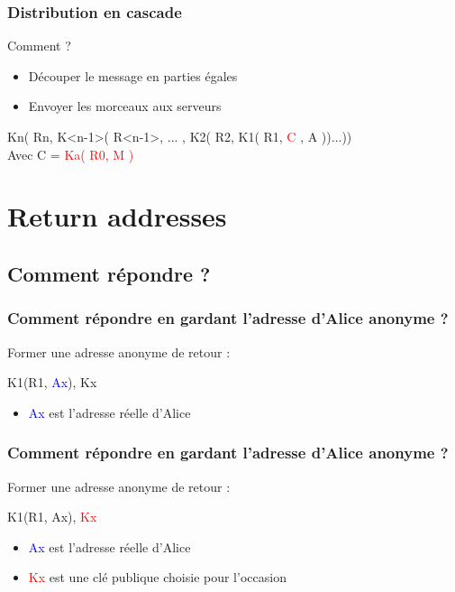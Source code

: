 \documentclass{beamer}
\begin{document}
\begin{frame}
\frametitle{Distribution en cascade}
\begin{block}{Comment ?}
\begin{itemize}
[triangle]
\item Découper le message en parties égales
\item Envoyer les morceaux aux serveurs
\end{itemize}
\end{block}

Kn( Rn, K<n-1>( R<n-1>, ... , K2( R2, K1( R1, \textcolor{red}{C} , A ))...))\\
$ $\\
Avec C = \textcolor{red}{Ka( R0, M )}

\end{frame}


\section{Return addresses}
\subsection{Comment répondre ?}
\begin{frame}
\frametitle{Comment répondre en gardant l'adresse d'Alice anonyme ?}
Former une adresse anonyme de retour :
\begin{center}
K1(R1, \textcolor{blue}{Ax}), Kx
\end{center}
\begin{itemize}
[triangle]
\item \textcolor{blue}{Ax} est l'adresse réelle d'Alice
\end{itemize}
\end{frame}

\begin{frame}
\frametitle{Comment répondre en gardant l'adresse d'Alice anonyme ?}
Former une adresse anonyme de retour :
\begin{center}
K1(R1, Ax), \textcolor{red}{Kx}
\end{center}
\begin{itemize}
[triangle]
\item \textcolor{blue}{Ax} est l'adresse réelle d'Alice
\item \textcolor{red}{Kx} est une clé publique choisie pour l'occasion
\end{itemize}
\end{frame}
\end{document}
